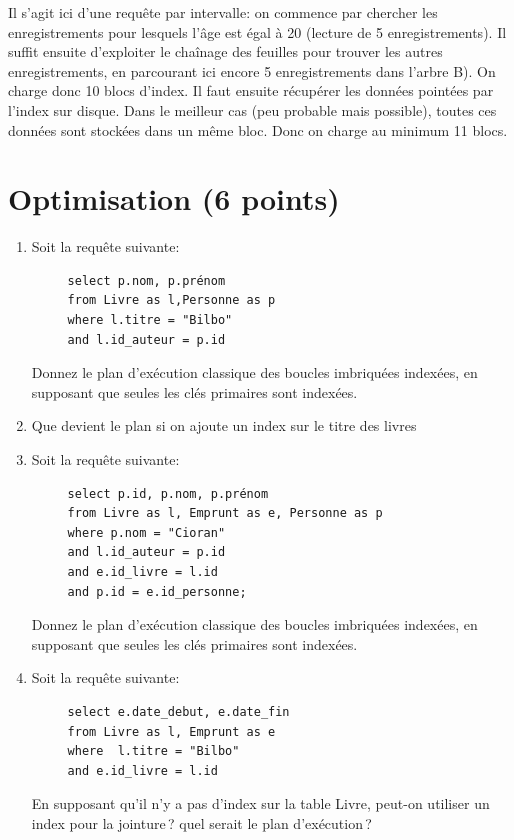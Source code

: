 \begin{enumerate}
\begin{solution}
Il s'agit ici d'une requête par intervalle: on commence par chercher les enregistrements pour lesquels l'âge est égal à 20 (lecture de 5 enregistrements). Il suffit ensuite d'exploiter le chaînage des feuilles pour trouver les autres enregistrements, en parcourant ici encore 5 enregistrements dans l'arbre B). On charge donc 10 
blocs d'index. Il faut ensuite récupérer les données pointées par l'index sur disque. Dans le meilleur cas (peu probable mais possible), toutes ces données sont stockées dans un même 
bloc. Donc on charge au minimum 11 blocs. 
\end{solution}

\end{enumerate}


\section{Optimisation (6 points)}

\begin{enumerate}

   \item Soit la requête suivante:
\begin{verbatim}
     select p.nom, p.prénom
     from Livre as l,Personne as p
     where l.titre = "Bilbo"
     and l.id_auteur = p.id
\end{verbatim}

  Donnez le plan d'exécution classique des boucles imbriquées indexées, en supposant
     que seules les clés primaires sont indexées.
     
    \item Que devient le plan si on ajoute un index sur le titre des livres 
     
\item Soit la requ\^ete suivante:

\begin{verbatim}
     select p.id, p.nom, p.prénom
     from Livre as l, Emprunt as e, Personne as p
     where p.nom = "Cioran"
     and l.id_auteur = p.id
     and e.id_livre = l.id
     and p.id = e.id_personne;
\end{verbatim}

  Donnez le plan d'exécution classique des boucles imbriquées indexées, en supposant
     que seules les clés primaires sont indexées.
     
     \item Soit la requ\^ete suivante:
     
\begin{verbatim}
     select e.date_debut, e.date_fin 
     from Livre as l, Emprunt as e
     where  l.titre = "Bilbo"
     and e.id_livre = l.id
\end{verbatim}

   En supposant qu'il n'y a pas d'index sur la table Livre, peut-on utiliser un index
   pour la jointure\,? quel
   serait le plan d'exécution\,?

\end{enumerate}


